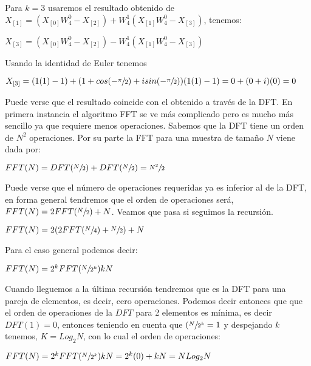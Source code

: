 \documentclass[a4paper]{article}
\begin{document}
Para $k = 3$ usaremos el resultado obtenido de $X_{[1]} = (X_{[0]} W_{4}^{0} - X_{[2]}) + W_{4}^{1} (X_{[1]} W_{4}^{0} - X_{[3]})$, tenemos:

\begin{center}
$X_{[3]} = (X_{[0]} W_{4}^{0} - X_{[2]}) - W_{4}^{1} (X_{[1]} W_{4}^{0} - X_{[3]})$
\end{center}

Usando la identidad de Euler tenemos

\begin{center}
$X_{[3]} = (1(1) - 1) + (1 + cos(-\sfrac{\pi}{2}) + i sin(-\sfrac{\pi}{2}))(1(1) - 1) = 0 + (0 + i)(0) = 0$
\end{center}

Puede verse que el resultado coincide con el obtenido a través de la DFT. En primera instancia el algoritmo FFT se ve más complicado pero es mucho más sencillo ya que requiere menos operaciones. Sabemos que la DFT tiene un orden de $N^{2}$ operaciones. Por su parte la FFT para una muestra de tamaño $N$ viene dada por:

\begin{center}
$FFT(N) = DFT(\sfrac{N}{2}) + DFT(\sfrac{N}{2}) = \sfrac{N^{2}}{2}$
\end{center}

Puede verse que el número de operaciones requeridas ya es inferior al de la DFT, en forma general tendremos que el orden de operaciones será, $FFT(N) = 2 FFT(\sfrac{N}{2}) + N$. Veamos que pasa si seguimos la recursión.

\begin{center}
$FFT(N) = 2 (2 FFT(\sfrac{N}{4}) + \sfrac{N}{2}) + N$
\end{center}

Para el caso general podemos decir:

\begin{center}
$FFT(N) = 2^{k} FFT(\sfrac{N}{2^{k}}) k N$
\end{center}

Cuando lleguemos a la última recursión tendremos que es la DFT para una pareja de elementos, es decir, cero operaciones. Podemos decir entonces que que el orden de operaciones de la $DFT$ para 2 elementos es mínima, es decir $DFT(1) = 0$, entonces teniendo en cuenta que $(\sfrac{N}{2^{k}} = 1$ y despejando $k$ tenemos, $K = Log_{2} N$, con lo cual el orden de operaciones:

\begin{center}
$FFT(N) = 2^{k} FFT(\sfrac{N}{2^{k}}) k N = 2^{k} (0) + k N = N Log_{2} N$
\end{center}
\end{document}
